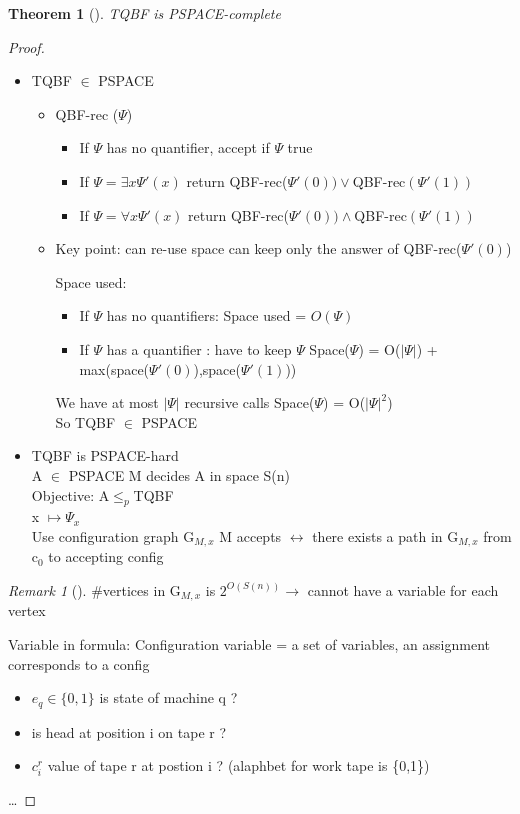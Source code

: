 \documentclass{article}
\newtheorem{theorem}{Theorem}
\theoremstyle{definition}
\theoremstyle{remark}
\newtheorem*{remark}{Remark}
\newcommand{\Thm}[3]{\begin{theorem}[#1]\label{#2}#3\end{theorem}}
\newcommand{\Rem}[3]{\begin{remark}[#1]\label{#2}#3\end{remark}}
\newcommand{\Proof}[1]{\begin{proof}#1\end{proof}}
\begin{document}
\Thm{}{}{TQBF is PSPACE-complete}
\Proof{~\\
\begin{itemize}
		\item TQBF $\in$ PSPACE
		\begin{itemize}
		\item QBF-rec ($\Psi$)
		\begin{itemize}
			\item If $\Psi$ has no quantifier, accept if $\Psi$ true
			\item If $\Psi = \exists x \Psi'(x)$ return QBF-rec($\Psi'(0))\vee$QBF-rec$(\Psi'(1))$
			\item If $\Psi = \forall x \Psi'(x)$ return QBF-rec($\Psi'(0))\wedge$QBF-rec$(\Psi'(1))$
		\end{itemize}
		\item Key point: can re-use space can keep only the answer of QBF-rec($\Psi'(0)$)
		
		Space used:
		\begin{itemize}
			\item If $\Psi$ has no quantifiers: Space used = $O(\Psi)$
			\item If $\Psi$ has a quantifier : have to keep $\Psi$ Space($\Psi$) = O($|\Psi|$) + max(space($\Psi'(0)$),space($\Psi'(1)$))
		\end{itemize}

		We have at most $|\Psi|$ recursive calls Space($\Psi$) = O($|\Psi|^2$)\\

		So TQBF $\in$ PSPACE\\
	\end{itemize}

\item TQBF is PSPACE-hard\\
A $\in$ PSPACE M decides A in space S(n)\\
Objective: A$\leq_p$TQBF\\
x $\mapsto \Psi_x$\\
Use configuration graph G$_{M,x}$
M accepts $\leftrightarrow$ there exists a path in G$_{M,x}$ from c$_0$ to accepting config
\end{itemize}

\Rem{}{}{\#vertices in G$_{M,x}$ is $2^{O(S(n))} \rightarrow$ cannot have a variable for each vertex}
	
Variable in formula:
	Configuration variable = a set of variables, an assignment corresponds to a config
	\begin{itemize}
		\item $e_q \in \{0,1\}$ is state of machine q ?
		\item is head at position i on tape r ?
		\item $c_i^r$ value of tape r at postion i ? (alaphbet for work tape is \{0,1\})
	\end{itemize}
\dots}
\end{document}
